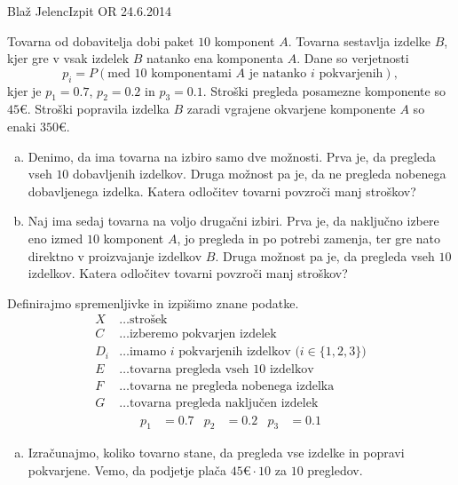 \begin{naloga}{Blaž Jelenc}{Izpit OR 24.6.2014}
\begin{vprasanje}
Tovarna od dobavitelja dobi paket $10$ komponent $A$.
Tovarna sestavlja izdelke $B$,
kjer gre v vsak izdelek $B$ natanko ena komponenta $A$.
Dane so verjetnosti
$$
p_i = P(\text{med $10$ komponentami $A$ je natanko $i$ pokvarjenih}),
$$
kjer je $p_1 = 0.7$, $p_2 = 0.2$ in $p_3 = 0.1$.
Stroški pregleda posamezne komponente so $45 €$.
Stroški popravila izdelka $B$ zaradi vgrajene okvarjene komponente $A$
so enaki $350 €$.
\begin{enumerate}[(a)]
\item Denimo, da ima tovarna na izbiro samo dve možnosti.
Prva je, da pregleda vseh $10$ dobavljenih izdelkov.
Druga možnost pa je, da ne pregleda nobenega dobavljenega izdelka.
Katera odločitev tovarni povzroči manj stroškov?

\item Naj ima sedaj tovarna na voljo drugačni izbiri.
Prva je, da naključno izbere eno izmed $10$ komponent $A$,
jo pregleda in po potrebi zamenja,
ter gre nato direktno v proizvajanje izdelkov $B$.
Druga možnost pa je, da pregleda vseh $10$ izdelkov.
Katera odločitev tovarni povzroči manj stroškov?
\end{enumerate}
\end{vprasanje}

\begin{odgovor}
Definirajmo spremenljivke in izpišimo znane podatke.
\begin{align*}
X &\dots \text{strošek} \\
C &\dots \text{izberemo pokvarjen izdelek} \\
D_i &\dots \text{imamo $i$ pokvarjenih izdelkov ($i \in \{1, 2, 3\}$)} \\
E &\dots \text{tovarna pregleda vseh $10$ izdelkov} \\
F &\dots \text{tovarna ne pregleda nobenega izdelka} \\
G &\dots \text{tovarna pregleda naključen izdelek}
\end{align*}
\begin{align*}
p_1 &= 0.7 & p_2 &= 0.2 & p_3 &= 0.1
\end{align*}

\begin{enumerate}[(a)]
\item Izračunajmo, koliko tovarno stane,
da pregleda vse izdelke in popravi po\-kva\-rje\-ne.
Vemo, da podjetje plača $45 € \cdot 10$ za $10$ pregledov.


\end{enumerate}
\end{odgovor}
\end{naloga}
